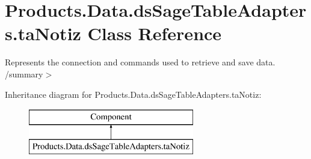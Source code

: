 \hypertarget{class_products_1_1_data_1_1ds_sage_table_adapters_1_1ta_notiz}{}\section{Products.\+Data.\+ds\+Sage\+Table\+Adapters.\+ta\+Notiz Class Reference}
\label{class_products_1_1_data_1_1ds_sage_table_adapters_1_1ta_notiz}


Represents the connection and commands used to retrieve and save data. /summary$>$  


Inheritance diagram for Products.\+Data.\+ds\+Sage\+Table\+Adapters.\+ta\+Notiz\+:\begin{figure}[H]
\begin{center}
\leavevmode
\includegraphics[height=2.000000cm]{class_products_1_1_data_1_1ds_sage_table_adapters_1_1ta_notiz}
\end{center}
\end{figure}
